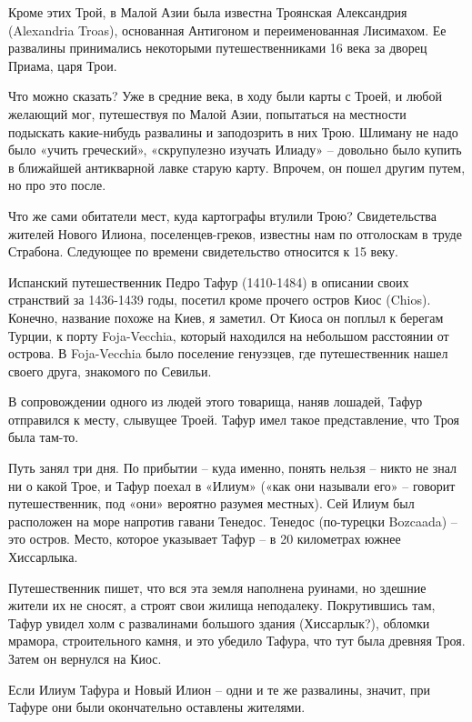 Кроме этих Трой, в Малой Азии была известна Троянская Александрия (Alexandria Troas), основанная Антигоном и переименованная Лисимахом. Ее развалины принимались некоторыми путешественниками 16 века за дворец Приама, царя Трои.

Что можно сказать? Уже в средние века, в ходу были карты с Троей, и любой желающий мог, путешествуя по Малой Азии, попытаться на местности подыскать какие-нибудь развалины и заподозрить в них Трою. Шлиману не надо было «учить греческий», «скрупулезно изучать Илиаду» – довольно было купить в ближайшей антикварной лавке старую карту. Впрочем, он пошел другим путем, но про это после.
 
Что же сами обитатели мест, куда картографы втулили Трою? Свидетельства жителей Нового Илиона, посе\-ленцев-греков, известны нам по отголоскам в труде Страбона. Следующее по времени свидетельство относится к 15 веку.

Испанский путешественник Педро Тафур (1410-1484) в описании своих странствий за 1436-1439 годы, посетил кроме прочего остров Киос (Chios). Конечно, название похоже на Киев, я заметил. От Киоса он поплыл к берегам Турции, к порту Foja-Vecchia, который находился на небольшом расстоянии от острова. В Foja-Vecchia было поселение генуэзцев, где путешественник нашел своего друга, знакомого по Севильи.

В сопровождении одного из людей этого товарища, наняв лошадей, Тафур отправился к месту, слывущее Троей. Тафур имел такое представление, что Троя была там-то.

Путь занял три дня. По прибытии – куда именно, понять нельзя – никто не знал ни о какой Трое, и Тафур поехал в «Илиум» («как они называли его» – говорит путешественник, под «они» вероятно разумея местных). Сей Илиум был расположен на море напротив гавани Тенедос. Тенедос (по-турецки Bozcaada) – это остров. Место, которое указывает Тафур – в 20 километрах южнее Хиссарлыка. 

Путешественник пишет, что вся эта земля наполнена руинами, но здешние жители их не сносят, а строят свои жилища неподалеку. Покрутившись там, Тафур увидел холм с развалинами большого здания (Хиссарлык?), обломки мрамора, строительного камня, и это убедило Тафура, что тут была древняя Троя. Затем он вернулся на Киос. 

Если Илиум Тафура и Новый Илион – одни и те же развалины, значит, при Тафуре они были окончательно оставлены жителями.

